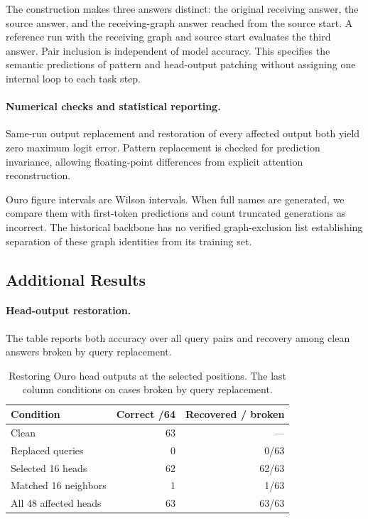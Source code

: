 \documentclass{article}
\begin{document}
The construction makes three answers distinct: the original receiving answer, the source answer, and the receiving-graph answer reached from the source start. A reference run with the receiving graph and source start evaluates the third answer. Pair inclusion is independent of model accuracy. This specifies the semantic predictions of pattern and head-output patching without assigning one internal loop to each task step.

\paragraph{Numerical checks and statistical reporting.}
Same-run output replacement and restoration of every affected output both yield zero maximum logit error. Pattern replacement is checked for prediction invariance, allowing floating-point differences from explicit attention reconstruction.

Ouro figure intervals are Wilson intervals. When full names are generated, we compare them with first-token predictions and count truncated generations as incorrect. The historical backbone has no verified graph-exclusion list establishing separation of these graph identities from its training set.

\subsection{Additional Results}
\label{app:ouro-results}
\paragraph{Head-output restoration.}
The table reports both accuracy over all query pairs and recovery among clean answers broken by query replacement.
\begin{table}[!htbp]\centering
\caption{Restoring Ouro head outputs at the selected positions. The last column conditions on cases broken by query replacement.}
\begin{tabular}{@{}lrr@{}}\toprule
Condition & Correct /64 & Recovered / broken\\\midrule
Clean & 63 & --- \\
Replaced queries & 0 & 0/63 \\
Selected 16 heads & 62 & 62/63 \\
Matched 16 neighbors & 1 & 1/63 \\
All 48 affected heads & 63 & 63/63 \\
\bottomrule\end{tabular}\end{table}
\end{document}
